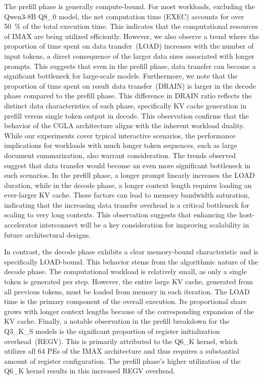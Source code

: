 The prefill phase is generally compute-bound.
For most workloads, excluding the Qwen3-8B Q8\_0 model, the net computation time (EXEC) accounts for over \SI{50}{\percent} of the total execution time. 
This indicates that the computational resources of IMAX are being utilized efficiently. 
However, we also observe a trend where the proportion of time spent on data transfer~(LOAD) increases with the number of input tokens, a direct consequence of the larger data sizes associated with longer prompts. 
This suggests that even in the prefill phase, data transfer can become a significant bottleneck for large-scale models.
Furthermore, we note that the proportion of time spent on result data transfer~(DRAIN) is larger in the decode phase compared to the prefill phase. 
This difference in DRAIN ratio reflects the distinct data characteristics of each phase, specifically KV cache generation in prefill versus single token output in decode. 
This observation confirms that the behavior of the CGLA architecture aligns with the inherent workload duality.
While our experiments cover typical interactive scenarios, the performance implications for workloads with much longer token sequences, such as large document summarization, also warrant consideration. 
The trends observed suggest that data transfer would become an even more significant bottleneck in such scenarios. 
In the prefill phase, a longer prompt linearly increases the LOAD duration, while in the decode phase, a longer context length requires loading an ever-larger KV cache. 
These factors can lead to memory bandwidth saturation, indicating that the increasing data transfer overhead is a critical bottleneck for scaling to very long contexts. 
This observation suggests that enhancing the host-accelerator interconnect will be a key consideration for improving scalability in future architectural designs.

In contrast, the decode phase exhibits a clear memory-bound characteristic and is specifically LOAD-bound. 
This behavior stems from the algorithmic nature of the decode phase. 
The computational workload is relatively small, as only a single token is generated per step. 
However, the entire large KV cache, generated from all previous tokens, must be loaded from memory in each iteration.
The LOAD time is the primary component of the overall execution. 
Its proportional share grows with longer context lengths because of the corresponding expansion of the KV cache.
Finally, a notable observation in the prefill breakdown for the Q3\_K\_S models is the significant proportion of register initialization overhead~(REGV). 
This is primarily attributed to the Q6\_K kernel, which utilizes all 64 PEs of the IMAX architecture and thus requires a substantial amount of register configuration. 
The prefill phase's higher utilization of the Q6\_K kernel results in this increased REGV overhead.

